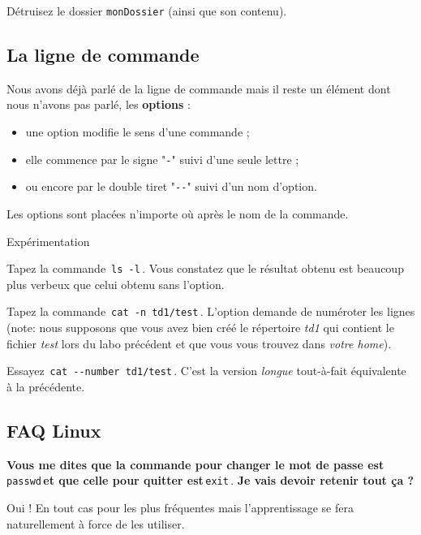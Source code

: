 \documentclass[a4paper,11pt]{article}
\begin{document}
\begin{Exercice}{}
D\'etruisez le dossier \verb_monDossier_ (ainsi que son contenu).
\end{Exercice}	

\subsection{La ligne de commande}
Nous avons d\'ej\`a parl\'e de la ligne de commande mais il reste un \'el\'ement dont nous n'avons pas parl\'e, les \textbf{options} :  
				
 \par
\begin{itemize}
\item une option modifie le sens d'une commande ;
\item elle commence par le signe "\verb|-|" suivi d'une seule lettre ;
\item ou encore par le double tiret "\verb|--|" suivi d'un nom d'option.
\end{itemize}
				
Les options sont plac\'ees n'importe o\`u apr\`es le nom de la commande.   
				
\par
        
			
\begin{Tutoriel}{Exp\'erimentation}		
\begin{steps}
\item Tapez la commande \,\verb|ls -l|\,. Vous constatez que le r\'esultat obtenu est beaucoup plus verbeux que celui obtenu sans l'option.
\item Tapez la commande \,\verb|cat -n td1/test|\,. L'option demande de num\'eroter les lignes (note: nous supposons que vous avez bien cr\'e\'e le r\'epertoire \textit{td1} qui contient le fichier \textit{test} lors du labo pr\'ec\'edent et que vous vous trouvez dans \textit{votre home}).
\item Essayez \,\verb|cat --number td1/test|\,. C'est la version \textit{longue} tout-\`a-fait \'equivalente \`a la pr\'ec\'edente.
\end{steps}
\end{Tutoriel}
\subsection{FAQ Linux}
\textbf{Vous me dites que la commande pour changer le mot de passe est}\,\verb|passwd|\,\textbf{et que celle pour quitter est}\,\verb|exit|\,. \textbf{Je vais devoir retenir tout \c ca ?}
 \par
Oui ! En tout cas pour les plus fr\'equentes mais l'apprentissage se fera naturellement \`a force de les utiliser.
						
\end{document}
